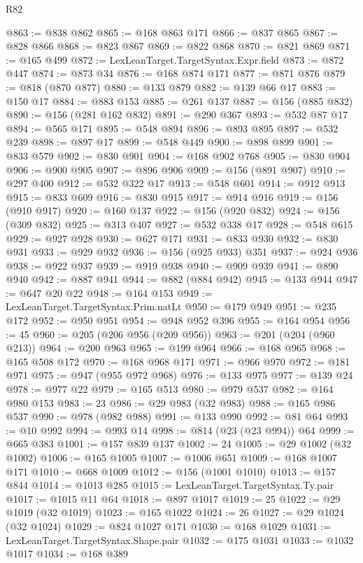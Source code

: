 \begin{lexlean}{R82}
\begin{coremodule}
@863 := @838 @862
@865 := @168 @863 @171
@866 := @837 @865
@867 := @828 @866
@868 := @823 @867
@869 := @822 @868
@870 := @821 @869
@871 := @165 @499
@872 := LexLeanTarget.TargetSyntax.Expr.field
@873 := @872 @447
@874 := @873 @34
@876 := @168 @874 @171
@877 := @871 @876
@879 := @818 (@870 @877)
@880 := @133 @879
@882 := @139 @66 @17
@883 := @150 @17
@884 := @883 @153
@885 := @261 @137
@887 := @156 (@885 @832)
@890 := @156 (@281 @162 @832)
@891 := @290 @367
@893 := @532 @87 @17
@894 := @565 @171
@895 := @548 @894
@896 := @893 @895
@897 := @532 @239
@898 := @897 @17
@899 := @548 @449
@900 := @898 @899
@901 := @833 @579
@902 := @830 @901
@904 := @168 @902 @768
@905 := @830 @904
@906 := @900 @905
@907 := @896 @906
@909 := @156 (@891 @907)
@910 := @297 @400
@912 := @532 @322 @17
@913 := @548 @601
@914 := @912 @913
@915 := @833 @609
@916 := @830 @915
@917 := @914 @916
@919 := @156 (@910 @917)
@920 := @160 @137
@922 := @156 (@920 @832)
@924 := @156 (@309 @832)
@925 := @313 @407
@927 := @532 @338 @17
@928 := @548 @615
@929 := @927 @928
@930 := @627 @171
@931 := @833 @930
@932 := @830 @931
@933 := @929 @932
@936 := @156 (@925 @933) @351
@937 := @924 @936
@938 := @922 @937
@939 := @919 @938
@940 := @909 @939
@941 := @890 @940
@942 := @887 @941
@944 := @882 (@884 @942)
@945 := @133 @944
@947 := @647 @20 @22
@948 := @164 @153
@949 := LexLeanTarget.TargetSyntax.Prim.natLt
@950 := @179 @949
@951 := @235 @172
@952 := @950 @951
@954 := @948 @952 @396
@955 := @164 @954
@956 := 45
@960 := @205 (@206 @956 (@209 @956))
@963 := @201 (@204 (@960 @213))
@964 := @200 @963
@965 := @199 @964
@966 := @168 @965
@968 := @165 @508 @172
@970 := @168 @968 @171
@971 := @966 @970
@972 := @181 @971
@975 := @947 (@955 @972 @968)
@976 := @133 @975
@977 := @139 @24
@978 := @977 @22
@979 := @165 @513
@980 := @979 @537
@982 := @164 @980 @153
@983 := 23
@986 := @29 @983 (@32 @983)
@988 := @165 @986 @537
@990 := @978 (@982 @988)
@991 := @133 @990
@992 := @81 @64
@993 := @10 @992
@994 := @993 @14
@998 := @814 (@23 (@23 @994)) @64
@999 := @665 @383
@1001 := @157 @839 @137
@1002 := 24
@1005 := @29 @1002 (@32 @1002)
@1006 := @165 @1005
@1007 := @1006 @651
@1009 := @168 @1007 @171
@1010 := @668 @1009
@1012 := @156 (@1001 @1010)
@1013 := @157 @844
@1014 := @1013 @285
@1015 := LexLeanTarget.TargetSyntax.Ty.pair
@1017 := @1015 @11 @64
@1018 := @897 @1017
@1019 := 25
@1022 := @29 @1019 (@32 @1019)
@1023 := @165 @1022
@1024 := 26
@1027 := @29 @1024 (@32 @1024)
@1029 := @824 @1027 @171
@1030 := @168 @1029
@1031 := LexLeanTarget.TargetSyntax.Shape.pair
@1032 := @175 @1031
@1033 := @1032 @1017
@1034 := @168 @389

\end{coremodule}
\end{lexlean}
